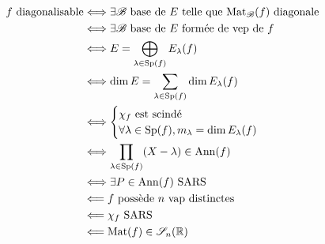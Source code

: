 \newpage

\begin{figure*}
    \begin{Large}
    \begin{align*}
        f \text{ diagonalisable} &\Longleftrightarrow \exists \mathscr{B} \text{ base de } E \text{ telle que } \mathrm{Mat}_\mathscr{B}(f) \text{ diagonale} \\
        &\Longleftrightarrow \exists \mathscr{B} \text{ base de } E \text{ formée de vep de } f\\
        &\Longleftrightarrow E = \bigoplus_{\lambda \in \mathrm{Sp}(f)} E_\lambda(f) \\
        &\Longleftrightarrow \dim E = \sum_{\lambda \in \mathrm{Sp}(f)} \dim E_\lambda(f) \\
        &\Longleftrightarrow 
        \begin{cases}
        \chi_f \text{ est scindé} \\
        \forall \lambda \in \mathrm{Sp}(f), m_{\lambda} = \dim E_\lambda(f)
        \end{cases} \\
        &\Longleftrightarrow \prod_{\lambda \in \mathrm{Sp}(f)}(X-\lambda) \in \mathrm{Ann}(f)\\
        &\Longleftrightarrow \exists P \in \mathrm{Ann}(f) \text{ SARS} \\
        &\Longleftarrow f \text{ possède } n \text{ vap distinctes} \\
        &\Longleftarrow \chi_f \text{ SARS} \\
        &\Longleftarrow \mathrm{Mat}(f) \in \mathscr{S}_n(\mathbb{R})
    \end{align*}
    \end{Large}
\end{figure*}

\begin{figure*}[h!]
    
\end{figure*}